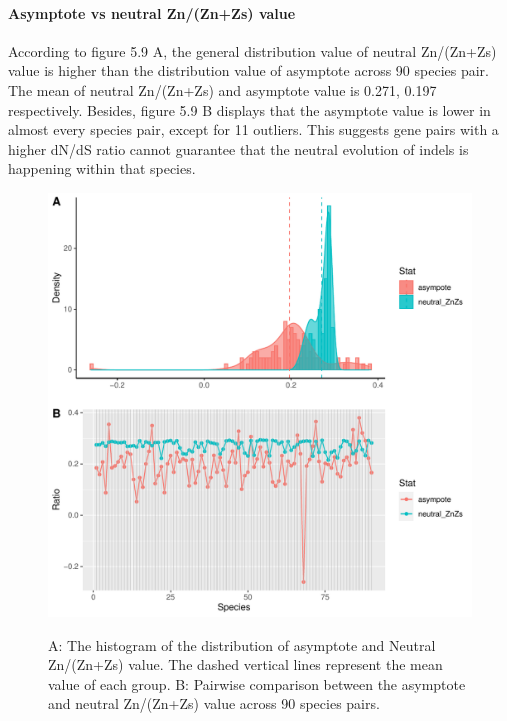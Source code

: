 \paragraph{Asymptote vs neutral Zn/(Zn+Zs) value} According to figure 5.9 A, the general distribution value of neutral Zn/(Zn+Zs) value is higher than the distribution value of asymptote across 90 species pair. The mean of neutral Zn/(Zn+Zs)  and asymptote value is 0.271, 0.197 respectively. Besides, figure 5.9 B displays that the asymptote value is lower in almost every species pair, except for 11 outliers. This suggests gene pairs with a higher dN/dS ratio cannot guarantee that the neutral evolution of indels is happening within that species.
\begin{figure}[H]
     \centering
     \begin{minipage}[t]{1\textwidth}
     \includegraphics[width=1\linewidth,height=1\linewidth]{Fig8.pdf}
     { {A: The histogram of the distribution of asymptote and Neutral Zn/(Zn+Zs) value. The dashed vertical lines represent the mean value of each group. B: Pairwise comparison between the asymptote and neutral Zn/(Zn+Zs) value across 90 species pairs.} 
 \par}
     \end{minipage}
\end{figure}

